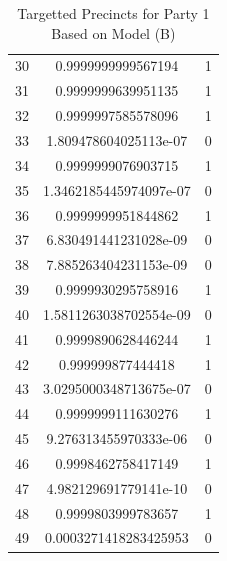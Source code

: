 \documentclass[12pt]{article}
\begin{document}
\begin{enumerate}[label=(\Alph*)]
\begin{table}
\begin{tabular}{ |c|c|c| }
					30 &  0.9999999999567194 & 1 \\
					31 &  0.9999999639951135 & 1 \\
					32 &  0.9999997585578096 & 1 \\
					33 &  1.809478604025113e-07 & 0 \\
					34 &  0.9999999076903715 & 1 \\
					35 &  1.3462185445974097e-07 & 0 \\
					36 &  0.9999999951844862 & 1 \\
					37 &  6.830491441231028e-09 & 0 \\
					38 &  7.885263404231153e-09 & 0 \\
					39 &  0.9999930295758916 & 1 \\
					40 &  1.5811263038702554e-09 & 0 \\
					41 &  0.9999890628446244 & 1 \\
					42 &  0.999999877444418 & 1 \\
					43 &  3.0295000348713675e-07 & 0 \\
					44 &  0.9999999111630276 & 1 \\
					45 &  9.276313455970333e-06 & 0 \\
					46 &  0.9998462758417149 & 1 \\
					47 &  4.982129691779141e-10 & 0 \\
					48 &  0.9999803999783657 & 1 \\
					49 &  0.0003271418283425953 & 0  \\
				 \hline
			\end{tabular}
			\caption{Targetted Precincts for Party 1 Based on Model (B)}
			\label{tab:targets_2}
		\end{table}


\end{enumerate}
\end{document}
